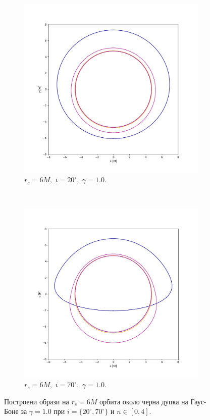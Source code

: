 \begin{figure}[!htb]
	\centering
	\begin{subfigure}{6cm}
		\centering
		\includegraphics[scale = 0.3]{GB_20_deg_r6_gamma_1.png}
		\caption{$r_s = 6M,\,\, i = 20^\circ,\,\,\gamma = 1.0$.} 
	\end{subfigure}\,\,\,
	\begin{subfigure}{6cm}
		\centering
		\includegraphics[scale = 0.3]{GB_70_deg_r6_gamma_1.png}
		\caption{$r_s = 6M,\,\, i = 70^\circ,\,\,\gamma = 1.0$.} 
	\end{subfigure}
	\caption[Построени образи на $r_s = 6M$ орбита около черна дупка на Гаус-Боне за различни инклинации.]{\small Построени образи на $r_s = 6M$ орбита около черна дупка на Гаус-Боне за $\gamma = 1.0$ при $i = \{20^\circ, 70^\circ\}$ и $n\in[0,4]$.} 
	\label{GB_r6_20_deg_gamma_1}
\end{figure}

